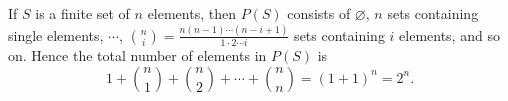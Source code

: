 If $S$ is a finite set of $n$ elements, then $P(S)$ consists of $\varnothing$, $n$ sets containing single elements, $\cdots$, $\binom{n}{i} = \frac{n(n-1) \cdots (n-i+1)}{1 \cdot 2 \cdots i}$ sets containing $i$ elements, and so on. Hence the total number of elements in $P(S)$ is
$$1 + \binom{n}{1} + \binom{n}{2} + \cdots + \binom{n}{n} = (1+1)^n = 2^n.$$

